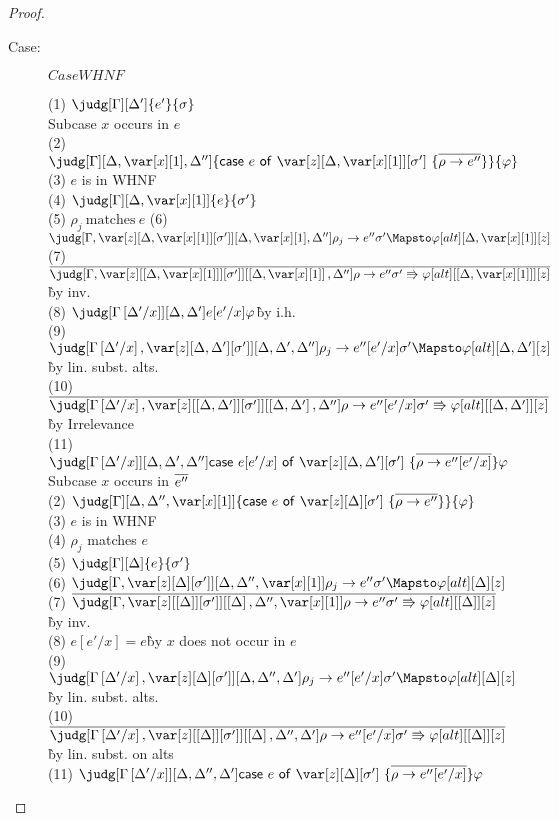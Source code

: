 \begin{proof}
\begin{description}
\item[Case:] $CaseWHNF$
\begin{tabbing}
    (1) $\judg[\G][\D']{e'}{\s}$\\
    Subcase $x$ occurs in $e$\\
    (2) $\judg[\G][\D,\xl,\D'']{\ccase{e}{\z[\D,\xl][\s']~\{\ov{\rho\to e''}\}}}{\vp}$\\
    (3) $e$ is in WHNF\\
    (4) $\judg[\G][\D,\xl]{e}{\s'}$\\
    (5) $\rho_j~\textrm{matches}~e$
    (6) $\judg[\G,\zr{\D,\xl}{\s'}][\D,\xl,\D'']{\rho_j \to e''}{\s' \Mapsto \vp}[alt][\D,\xl][z]$\\
    (7) $\ov{\judg[\G,\zr{\irr{\D,\xl}}{\s'}][\irr{\D,\xl},\D'']{\rho\to e''}{\s' \Rrightarrow \vp}[alt][\irr{\D,\xl}][z]}$\`by inv.\\
    (8) $\judg[\subst{\G}{\D'}{x}][\D,\D']{e[e'/x]}{\vp}$\`by i.h.\\
    (9) $\judg[\subst{\G}{\D'}{x},\zr{\D,\D'}{\s'}][\D,\D',\D'']{\rho_j \to e''[e'/x]}{\s' \Mapsto \vp}[alt][\D,\D'][z]$\` by lin. subst. alts.\\
    (10) $\ov{\judg[\subst{\G}{\D'}{x},\zr{\irr{\D,\D'}}{\s'}][\irr{\D,\D'},\D'']{\rho\to e''[e'/x]}{\s' \Rrightarrow \vp}[alt][\irr{\D,\D'}][z]}$ \` by Irrelevance\\
    (11) $\judg[\subst{\G}{\D'}{x}][\D,\D',\D'']{\ccase{e[e'/x]}{\z[\D,\D'][\s']~\{\ov{\rho\to e''[e'/x]}\}}}{\vp}$\\
    Subcase $x$ occurs in $\overline{e''}$\\
    (2) $\judg[\G][\D,\D'',\xl]{\ccase{e}{\z[\D][\s']~\{\ov{\rho\to e''}\}}}{\vp}$\\
    (3) $e$ is in WHNF\\
    (4) $\rho_j$ matches $e$\\
    (5) $\judg[\G][\D]{e}{\s'}$\\
    (6) $\judg[\G,\zr{\D}{\s'}][\D,\D'',\xl]{\rho_j \to e''}{\s' \Mapsto \vp}[alt][\D][z]$\\
    (7) $\ov{\judg[\G,\zr{\irr{\D}}{\s'}][\irr{\D},\D'',\xl]{\rho\to e''}{\s' \Rrightarrow \vp}[alt][\irr{\D}][z]}$\`by inv.\\
    (8) $e[e'/x] = e$\` by $x$ does not occur in $e$\\
    (9) $\judg[\subst{\G}{\D'}{x},\zr{\D}{\s'}][\D,\D'',\D']{\rho_j \to e''[e'/x]}{\s' \Mapsto \vp}[alt][\D][z]$\`by lin. subst. alts.\\
    (10) $\ov{\judg[\subst{\G}{\D'}{x},\zr{\irr{\D}}{\s'}][\irr{\D},\D'',\D']{\rho\to e''[e'/x]}{\s' \Rrightarrow \vp}[alt][\irr{\D}][z]}$\`by lin. subst. on alts\\
    (11) $\judg[\subst{\G}{\D'}{x}][\D,\D'',\D']{\ccase{e}{\z[\D][\s']~\{\ov{\rho\to e''[e'/x]}\}}}{\vp}$\\
\end{tabbing}


\end{description}
\end{proof}
